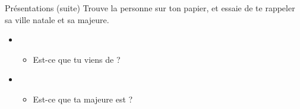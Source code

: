 \begin{frame}{Présentations (suite)}
  Trouve la personne sur ton papier, et essaie de te rappeler sa ville natale et sa majeure.
  \begin{center}
    \begin{itemize}
      \item {}
      \begin{itemize}
        \item<2->[$\to$] Est-ce que tu viens de \underline{\hspace{3cm}}?
      \end{itemize}
      \item {}
      \begin{itemize}
        \item<3->[$\to$] Est-ce que ta majeure est \underline{\hspace{3cm}}?
      \end{itemize}
    \end{itemize}
  \end{center}
\end{frame}